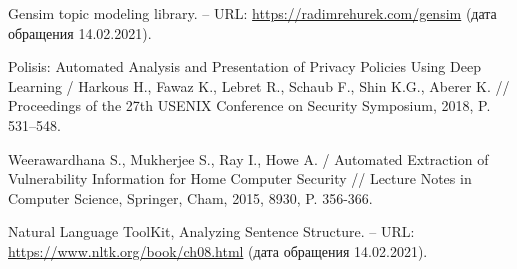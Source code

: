 \documentclass[../main]{subfiles}
\begin{document}
\begin{english}
\begin{biblenum}
     Gensim topic modeling library. -- URL: \url{https://radimrehurek.com/gensim} (\textrussian{дата обращения} 14.02.2021).

     Polisis: Automated Analysis and Presentation of Privacy Policies Using Deep Learning / Harkous H., Fawaz K., Lebret R., Schaub F., Shin K.G., Aberer K. // Proceedings of the 27th USENIX Conference on Security Symposium, 2018, P. 531–548.

     Weerawardhana S., Mukherjee S., Ray I., Howe A. / Automated Extraction of Vulnerability Information for Home Computer Security // Lecture Notes in Computer Science, Springer, Cham, 2015, 8930, P. 356-366.

     Natural Language ToolKit, Analyzing Sentence Structure. -- URL: \url{https://www.nltk.org/book/ch08.html} (\textrussian{дата обращения} 14.02.2021).


    





\end{biblenum}
\end{english}
\end{document}
